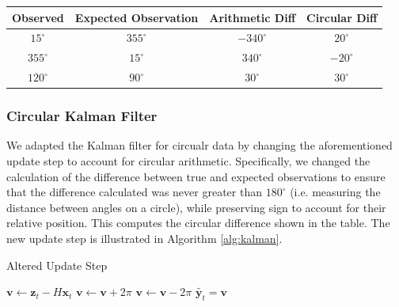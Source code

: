 \documentclass[11pt]{amsart}
\begin{document}
\begin{center}
    \begin{tabular}{||c c c c||}
     \hline
     Observed & Expected Observation & Arithmetic Diff & Circular Diff \\ 
     \hline\hline
     $15^{\circ}$ & $355^{\circ}$ & $-340^{\circ}$ & $20^{\circ}$ \\ 
     \hline
     $355^{\circ}$ & $15^{\circ}$ &  $340^{\circ}$ & $-20^{\circ}$ \\
     \hline
     $120^{\circ}$ & $90^{\circ}$ & $30^{\circ}$ & $30^{\circ}$ \\ [1ex] 
     \hline
    \end{tabular}
    \end{center}



\subsubsection{Circular Kalman Filter}
We adapted the Kalman filter for circualr data by changing the aforementioned update step to account for circular arithmetic. Specifically, we changed the calculation of the difference between true and expected observations to ensure that the difference calculated was never greater than $180^{\circ}$ (i.e. measuring the distance between angles on a circle), while preserving sign to account for their relative position. This computes the circular difference shown in the table. The new update step is illustrated in Algorithm \ref{alg:kalman}.


\begin{algorithm}
    \caption{Altered Update Step}\label{alg:kalman}    
    \begin{algorithmic}
        \State $\mathbf{v} \gets \mathbf{z}_t - H\mathbf{x}_t$
            \State $\mathbf{v} \gets \mathbf{v} + 2\pi$
            \State $\mathbf{v} \gets \mathbf{v} - 2\pi$
        \EndIf 
        \State $\tilde{\mathbf{y}_t} = \mathbf{v}$ 
        \end{algorithmic}
    \end{algorithm}

\end{document}
